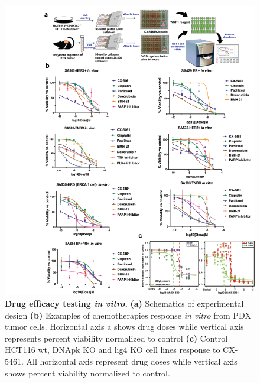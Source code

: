 \begin{figure}
	\centering
	\includegraphics[width=\textwidth]{Figures/chap3/invitro.png}
	\caption[Drug efficacy testing \textit{in vitro} ]
	{\small
	    \textbf{Drug efficacy testing \textit{in vitro}.}
	    \textbf{(a)} Schematics of experimental design
	    \textbf{(b)} Examples of chemotherapies response \textit{in vitro} from PDX tumor cells. Horizontal axis a shows drug doses while vertical axis represents percent viability normalized to control
	    \textbf{(c)} Control HCT116 wt, DNApk KO and lig4 KO cell lines response to CX-5461. All horizontal axis represent drug doses while vertical axis shows percent viability normalized to control.
	}
	\label{fig:invitro}
\end{figure}



